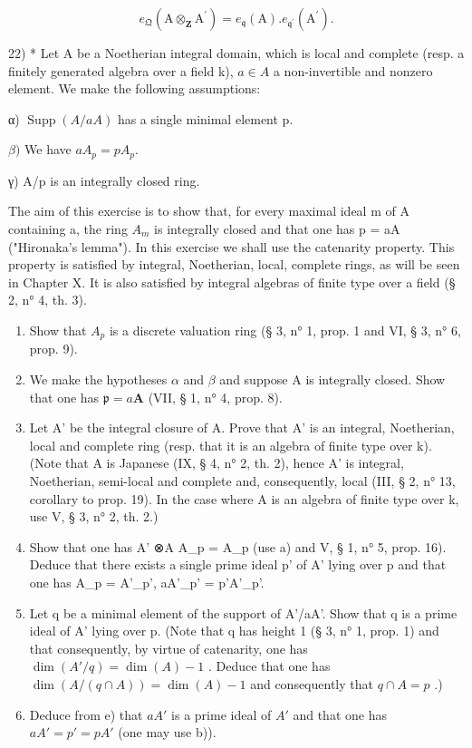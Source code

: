\[
e _ {\mathfrak {Q}} (\mathrm{A} \otimes_ {\mathbf {Z}} \mathrm{A} ^ {\prime}) = e _ {\mathfrak {q}} (\mathrm{A}). e _ {\mathfrak {q} ^ {\prime}} (\mathrm{A} ^ {\prime}).
\]

22) * Let A be a Noetherian integral domain, which is local and complete (resp. a finitely generated algebra over a field k), \(a \in A\) a non-invertible and nonzero element. We make the following assumptions:

α) \(\operatorname{Supp}(A/aA)\) has a single minimal element p.

\(\beta)\) We have \(aA_{p} = pA_{p}\).

γ) A/p is an integrally closed ring.

The aim of this exercise is to show that, for every maximal ideal m of A containing a, the ring \(A_{m}\) is integrally closed and that one has p = aA ("Hironaka's lemma"). In this exercise we shall use the catenarity property. This property is satisfied by integral, Noetherian, local, complete rings, as will be seen in Chapter X. It is also satisfied by integral algebras of finite type over a field (§ 2, n° 4, th. 3).

\begin{enumerate}
\def\labelenumi{\alph{enumi})}
\item
  Show that \(A_p\) is a discrete valuation ring (§ 3, n° 1, prop. 1 and VI, § 3, n° 6, prop. 9).
\item
  We make the hypotheses \(\alpha\) and \(\beta\) and suppose A is integrally closed. Show that one has \(\mathfrak{p} = a\mathbf{A}\) (VII, § 1, n° 4, prop. 8).
\item
  Let A' be the integral closure of A. Prove that A' is an integral, Noetherian, local and complete ring (resp. that it is an algebra of finite type over k). (Note that A is Japanese (IX, § 4, n° 2, th. 2), hence A' is integral, Noetherian, semi-local and complete and, consequently, local (III, § 2, n° 13, corollary to prop. 19). In the case where A is an algebra of finite type over k, use V, § 3, n° 2, th. 2.)
\item
  Show that one has A' ⊗A A\_p = A\_p (use a) and V, § 1, n° 5, prop. 16). Deduce that there exists a single prime ideal p' of A' lying over p and that one has A\_p = A'\_p', aA'\_p' = p'A'\_p'.
\item
  Let q be a minimal element of the support of A'/aA'. Show that q is a prime ideal of A' lying over p. (Note that q has height 1 (§ 3, n° 1, prop. 1) and that consequently, by virtue of catenarity, one has \(\dim(A'/q)=\dim(A)-1\) . Deduce that one has \(\dim(A/(q \cap A))=\dim(A)-1\) and consequently that \(q \cap A = p\) .)
\item
  Deduce from e) that \(aA'\) is a prime ideal of \(A'\) and that one has \(aA' = p' = pA'\) (one may use b)).
\end{enumerate}


